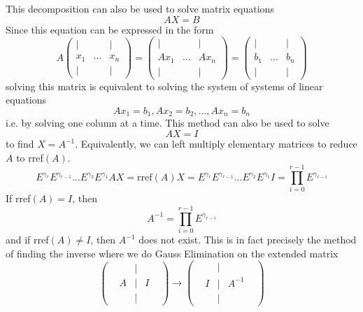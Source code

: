   This decomposition can also be used to solve matrix equations
  \begin{equation}
    A X = B
  \end{equation}
  Since this equation can be expressed in the form
  \begin{equation}
    A \begin{pmatrix}
    | & & | \\ x_1 & ... & x_n \\ | & & | 
    \end{pmatrix} = \begin{pmatrix}
    | & & | \\ A x_1 & ... & A x_n \\ | & & | 
    \end{pmatrix} = \begin{pmatrix}
    | & & | \\ b_1 & ... & b_n \\ | & & | 
    \end{pmatrix}
  \end{equation}
  solving this matrix is equivalent to solving the system of systems of linear equations 
  \begin{equation}
    Ax_1 = b_1, Ax_2 = b_2, ..., Ax_n = b_n
  \end{equation}
  i.e. by solving one column at a time. This method can also be used to solve 
  \begin{equation}
    A X = I
  \end{equation}
  to find $X = A^{-1}$. Equivalently, we can left multiply elementary matrices to reduce $A$ to rref$(A)$. 
  \begin{equation}
    E^{\gamma_r} E^{\gamma_{r-1}} ... E^{\gamma_2} E^{\gamma_1} A X = \text{rref}(A) X = E^{\gamma_r} E^{\gamma_{r-1}} ... E^{\gamma_2} E^{\gamma_1} I = \prod_{i = 0}^{r-1} E^{\gamma_{r-i}}
  \end{equation}
  If rref$(A)= I$, then 
  \begin{equation}
    A^{-1} = \prod_{i = 0}^{r-1} E^{\gamma_{r-i}}
  \end{equation}
  and if rref$(A) \neq I$, then $A^{-1}$ does not exist. This is in fact precisely the method of finding the inverse where we do Gauss Elimination on the extended matrix
  \begin{equation}
    \begin{pmatrix}
    & &| & & \\ & A &| & I & \\ & &| & & 
    \end{pmatrix} \longrightarrow \begin{pmatrix}
    & &| & & \\ & I &| & A^{-1} & \\ & &| & & 
    \end{pmatrix}
  \end{equation}


